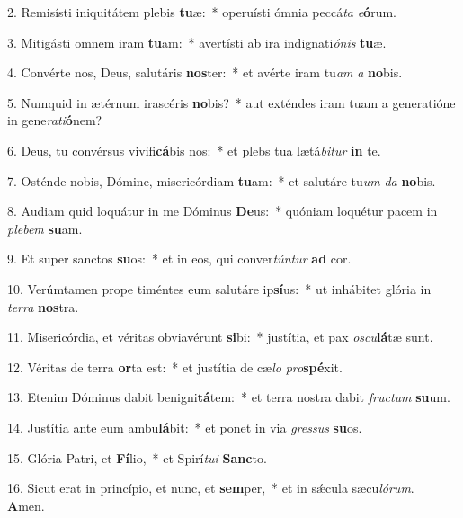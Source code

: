 2. Remisísti iniquitátem plebis \textbf{tu}æ:~*  operuísti ómnia peccá\textit{ta} \textit{e}\textbf{ó}rum.\

3. Mitigásti omnem iram \textbf{tu}am:~*  avertísti ab ira indignati\textit{ó}\textit{nis} \textbf{tu}æ.\

4. Convérte nos, Deus, salutáris \textbf{nos}ter:~*  et avérte iram tu\textit{am} \textit{a} \textbf{no}bis.\

5. Numquid in ætérnum irascéris \textbf{no}bis?~*  aut exténdes iram tuam a generatióne in gene\textit{ra}\textit{ti}\textbf{ó}nem?\

6. Deus, tu convérsus vivifi\textbf{cá}bis nos:~*  et plebs tua lætá\textit{bi}\textit{tur} \textbf{in} te.\

7. Osténde nobis, Dómine, misericórdiam \textbf{tu}am:~*  et salutáre tu\textit{um} \textit{da} \textbf{no}bis.\

8. Audiam quid loquátur in me Dóminus \textbf{De}us:~*  quóniam loquétur pacem in \textit{ple}\textit{bem} \textbf{su}am.\

9. Et super sanctos \textbf{su}os:~*  et in eos, qui conver\textit{tún}\textit{tur} \textbf{ad} cor.\

10. Verúmtamen prope timéntes eum salutáre ip\textbf{sí}us:~*  ut inhábitet glória in \textit{ter}\textit{ra} \textbf{nos}tra.\

11. Misericórdia, et véritas obviavérunt \textbf{si}bi:~*  justítia, et pax \textit{os}\textit{cu}\textbf{lá}tæ sunt.\

12. Véritas de terra \textbf{or}ta est:~*  et justítia de cæ\textit{lo} \textit{pro}\textbf{spé}xit.\

13. Etenim Dóminus dabit benigni\textbf{tá}tem:~*  et terra nostra dabit \textit{fruc}\textit{tum} \textbf{su}um.\

14. Justítia ante eum ambu\textbf{lá}bit:~*  et ponet in via \textit{gres}\textit{sus} \textbf{su}os.\

15. Glória Patri, et \textbf{Fí}lio,~*  et Spirí\textit{tu}\textit{i} \textbf{Sanc}to.\

16. Sicut erat in princípio, et nunc, et \textbf{sem}per,~*  et in sǽcula sæcu\textit{ló}\textit{rum}. \textbf{A}men.\

